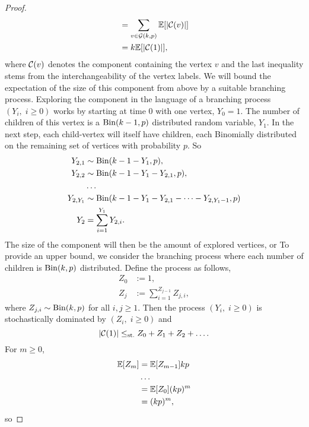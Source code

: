 \begin{proof}
\begin{equation}
\begin{aligned}
	&= \sum_{v \in \mathcal{G}(k,p)} \mathbb{E}[|\mathcal{C}(v)|] \\
	&= k \mathbb{E}[|\mathcal{C}(1)|],
	\end{aligned}
	\end{equation}
	where $\mathcal{C}(v)$ denotes the component containing the vertex $v$ and the last inequality stems from the interchangeability of the vertex labels.
	We will bound the expectation of the size of this component from above by a suitable branching process.
	Exploring the component in the language of a branching process $(Y_i, \; i\geq 0)$ works by starting at time $0$ with one vertex,
	$Y_0 = 1$.
	The number of children of this vertex is a $\operatorname*{Bin}(k-1,p)$ distributed random variable, $Y_1$.
	In the next step, each child-vertex will itself have children,
	each Binomially distributed on the remaining set of vertices with probability $p$.
	So 
	\begin{align*}
	Y_{2,1} &\sim \operatorname*{Bin}(k-1-Y_1,p), \\ 
	Y_{2,2} &\sim \operatorname*{Bin}(k-1-Y_1-Y_{2,1},p), \\
	&\dots \\
	Y_{2,Y_1} &\sim \operatorname*{Bin}(k-1-Y_1-Y_{2,1}-\dots-Y_{2,Y_1-1},p) \\
	Y_2 &= \sum_{i=1}^{Y_1} Y_{2,i}.
	\end{align*}
	The size of the component will then be the amount of explored vertices,
	or 
	To provide an upper bound,
	we consider the branching process where each number of children is $\operatorname*{Bin}(k,p)$ distributed.
	Define the process as follows,
	\begin{equation}
	\begin{aligned}
	Z_0 &:= 1, \\
	Z_j &:= \sum_{i=1}^{Z_{j-1}} Z_{j,i},
	\end{aligned}
	\end{equation}
	 where $Z_{j,i} \sim\operatorname*{Bin}(k,p)$ for all $i,j \geq 1$.
	 Then the process $(Y_i, \; i\geq 0)$ is stochastically dominated by 
	 $(Z_i, \; i\geq 0)$ and
	 \begin{equation}
	 |\mathcal{C}(1)| \leq_{\text{st.}} Z_0 + Z_1 + Z_2 + \dots.
	 \end{equation}
	 For $m\geq0$,
	 \begin{align*}
	 \mathbb{E}[Z_m] 
	 &= \mathbb{E}[Z_{m-1}]kp \\
	 &\dots \\
	 &= \mathbb{E}[Z_0](kp)^m \\
	 &= (kp)^m,
	 \end{align*}
	so

\end{proof}
